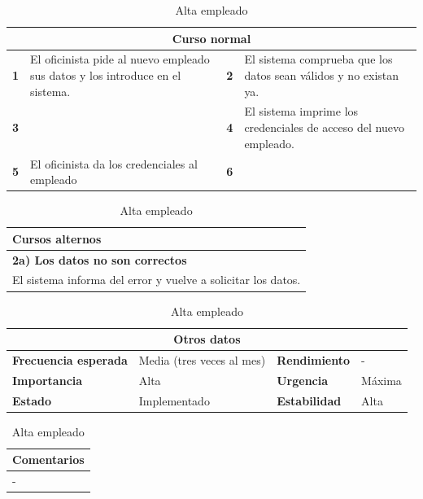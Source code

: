 \documentclass[12pt,spanish]{article}
\begin{document}
\begin{table}[H]
\vspace{1cm}

\begin{tabular}{|m{4pt}|m{7.33cm}|m{4pt}|m{7.33cm}|}
\hline
\multicolumn{4}{|c|}{\textbf{Curso normal}} \\
\hline
\textbf{1} & El oficinista pide al nuevo empleado sus datos y los introduce en el sistema. & \textbf{2} & El sistema comprueba que los datos sean válidos y no existan ya. \\
\hline
\textbf{3} &  & \textbf{4} & El sistema imprime los credenciales de acceso del nuevo empleado. \\
\hline
\textbf{5} & El oficinista da los credenciales al empleado & \textbf{6} &  \\
\hline
\end{tabular}

\vspace{1cm}

\begin{tabular}{|m{10pt}|m{7.15cm}|m{10pt}|m{7.15cm}|}
\hline
\multicolumn{4}{|m{16.2cm}|}{\textbf{Cursos alternos}} \\
\hline
\multicolumn{4}{|m{16.2cm}|}{\textbf{2a) Los datos no son correctos}} \\
\hline
\multicolumn{4}{|m{16.2cm}|}{El sistema informa del error y vuelve a solicitar los datos.} \\
\hline
\end{tabular}

\vspace{1cm}

\begin{tabular}{|m{3.72cm}|m{3.72cm}|m{3.72cm}|m{3.72cm}|}
\hline
\multicolumn{4}{|c|}{\textbf{Otros datos}} \\
\hline
\textbf{Frecuencia esperada} & Media (tres veces al mes) & \textbf{Rendimiento} & - \\
\hline
\textbf{Importancia} & Alta & \textbf{Urgencia} & Máxima \\
\hline
\textbf{Estado} & Implementado & \textbf{Estabilidad} & Alta \\
\hline
\end{tabular}

\vspace{1cm}

\begin{tabular}{|m{16.2cm}|}
\hline
\textbf{Comentarios} \\
\hline
- \\
\hline
\end{tabular}

\caption{Alta empleado}

\end{table}
\end{document}
